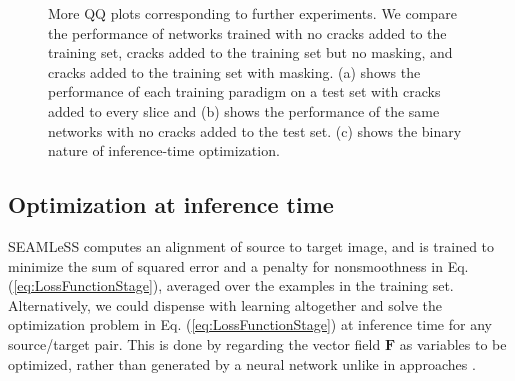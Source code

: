 \documentclass{article}
\renewcommand{\vec}[1]{\mathbf{#1}}
\begin{document}
\begin{figure}[htp] 
    \centering
    \hfill%
    \hfill%
    \caption{More QQ plots corresponding to further experiments. We compare the performance of networks trained with no cracks added to the training set, cracks added to the training set but no masking, and cracks added to the training set with masking. (a) shows the performance of each training paradigm on a test set with cracks added to every slice and (b) shows the performance of the same networks with no cracks added to the test set. (c) shows the binary nature of inference-time optimization.}
\end{figure}

\subsection{Optimization at inference time}
SEAMLeSS computes an alignment of source to target image, and is trained to minimize the sum of squared error and a penalty for nonsmoothness in Eq. (\ref{eq:LossFunctionStage}), averaged over the examples in the training set. Alternatively, we could dispense with learning altogether and solve the optimization problem in Eq. (\ref{eq:LossFunctionStage}) at inference time for any source/target pair. This is done by regarding the vector field $\vec{F}$ as variables to be optimized, rather than generated by a neural network unlike in approaches \citep{weinzaepfel2013deepflow, revaud2015epicflow}. 
\end{document}
